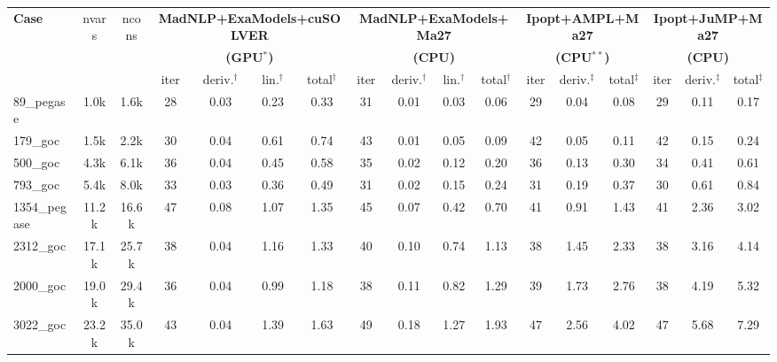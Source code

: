 \begin{tabular}{|l|c|c|cccc|cccc|ccc|ccc|}
  \hline
  \multirow{3}{*}{\textbf{Case}}
  & \multirow{3}{*}{nvars}
  & \multirow{3}{*}{ncons}
  & \multicolumn{4}{c|}{\textbf{MadNLP+ExaModels+cuSOLVER}}
  & \multicolumn{4}{c|}{\textbf{MadNLP+ExaModels+Ma27}}
  & \multicolumn{3}{c|}{\textbf{Ipopt+AMPL+Ma27}}
  & \multicolumn{3}{c|}{\textbf{Ipopt+JuMP+Ma27}}\\
  & & &\multicolumn{4}{c|}{\textbf{(GPU$^*$)}} &\multicolumn{4}{c|}{\textbf{(CPU)}} &\multicolumn{3}{c|}{\textbf{(CPU$^{**}$)}}&\multicolumn{3}{c|}{\textbf{(CPU)}}
  \\
  \cline{4-17}
  & & 
  & iter & deriv.$^\dag$ & lin.$^\dag$ & total$^\dag$
  & iter & deriv.$^\dag$ & lin.$^\dag$ & total$^\dag$
  & iter & deriv.$^\ddag$ & total$^\ddag$
  & iter & deriv.$^\ddag$ & total$^\ddag$
  \\
  \hline
89\_pegase 
&   1.0k
&   1.6k
& 28 
&  0.03
&  0.23
&  0.33
& 31 
&  0.01
&  0.03
&  0.06
& 29 
&  0.04
&  0.08
& 29 
&  0.11
&  0.17
\\

179\_goc 
&   1.5k
&   2.2k
& 30 
&  0.04
&  0.61
&  0.74
& 43 
&  0.01
&  0.05
&  0.09
& 42 
&  0.05
&  0.11
& 42 
&  0.15
&  0.24
\\

500\_goc 
&   4.3k
&   6.1k
& 36 
&  0.04
&  0.45
&  0.58
& 35 
&  0.02
&  0.12
&  0.20
& 36 
&  0.13
&  0.30
& 34 
&  0.41
&  0.61
\\

793\_goc 
&   5.4k
&   8.0k
& 33 
&  0.03
&  0.36
&  0.49
& 31 
&  0.02
&  0.15
&  0.24
& 31 
&  0.19
&  0.37
& 30 
&  0.61
&  0.84
\\

1354\_pegase 
&  11.2k
&  16.6k
& 47 
&  0.08
&  1.07
&  1.35
& 45 
&  0.07
&  0.42
&  0.70
& 41 
&  0.91
&  1.43
& 41 
&  2.36
&  3.02
\\
\hline
2312\_goc 
&  17.1k
&  25.7k
& 38 
&  0.04
&  1.16
&  1.33
& 40 
&  0.10
&  0.74
&  1.13
& 38 
&  1.45
&  2.33
& 38 
&  3.16
&  4.14
\\

2000\_goc 
&  19.0k
&  29.4k
& 36 
&  0.04
&  0.99
&  1.18
& 38 
&  0.11
&  0.82
&  1.29
& 39 
&  1.73
&  2.76
& 38 
&  4.19
&  5.32
\\

3022\_goc 
&  23.2k
&  35.0k
& 43 
&  0.04
&  1.39
&  1.63
& 49 
&  0.18
&  1.27
&  1.93
& 47 
&  2.56
&  4.02
& 47 
&  5.68
&  7.29
\\


\end{tabular}
